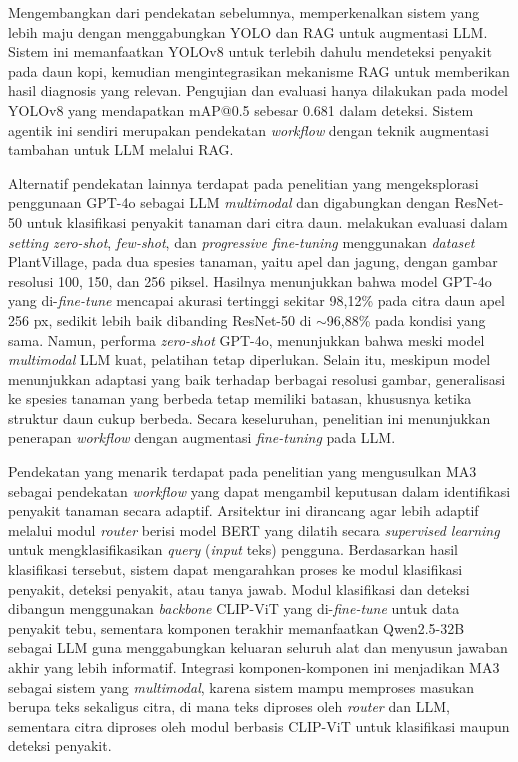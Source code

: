 Mengembangkan dari pendekatan sebelumnya, \textcite{mondalVisionMeetsLanguage2025} memperkenalkan sistem yang lebih maju dengan menggabungkan YOLO dan RAG untuk augmentasi LLM. Sistem ini memanfaatkan YOLOv8 untuk terlebih dahulu mendeteksi penyakit pada daun kopi, kemudian mengintegrasikan mekanisme RAG untuk memberikan hasil diagnosis yang relevan. Pengujian dan evaluasi hanya dilakukan pada model YOLOv8 yang mendapatkan mAP@0.5 sebesar 0.681 dalam deteksi. Sistem agentik ini sendiri merupakan pendekatan \textit{workflow} dengan teknik augmentasi tambahan untuk LLM melalui RAG.

Alternatif pendekatan lainnya terdapat pada penelitian \textcite{roumeliotisPlantDiseaseDetection2025} yang mengeksplorasi penggunaan GPT-4o sebagai LLM \textit{multimodal} dan digabungkan dengan ResNet-50 untuk klasifikasi penyakit tanaman dari citra daun. \citeauthor{roumeliotisPlantDiseaseDetection2025} melakukan evaluasi dalam \textit{setting zero-shot}, \textit{few-shot}, dan \textit{progressive fine-tuning} menggunakan \textit{dataset} PlantVillage, pada dua spesies tanaman, yaitu apel dan jagung, dengan gambar resolusi 100, 150, dan 256 piksel. Hasilnya menunjukkan bahwa model GPT-4o yang di-\textit{fine-tune} mencapai akurasi tertinggi sekitar 98,12\% pada citra daun apel 256 px, sedikit lebih baik dibanding ResNet-50 di $\sim$96,88\% pada kondisi yang sama. Namun, performa \textit{zero-shot} GPT-4o, menunjukkan bahwa meski model \textit{multimodal} LLM kuat, pelatihan tetap diperlukan. Selain itu, meskipun model menunjukkan adaptasi yang baik terhadap berbagai resolusi gambar, generalisasi ke spesies tanaman yang berbeda tetap memiliki batasan, khususnya ketika struktur daun cukup berbeda. Secara keseluruhan, penelitian ini menunjukkan penerapan \textit{workflow} dengan augmentasi \textit{fine-tuning} pada LLM.

Pendekatan yang menarik terdapat pada penelitian \textcite{xuMultimodalAgriculturalAgent2025} yang mengusulkan MA3 sebagai pendekatan \textit{workflow} yang dapat mengambil keputusan dalam identifikasi penyakit tanaman secara adaptif. Arsitektur ini dirancang agar lebih adaptif melalui modul \textit{router} berisi model BERT yang dilatih secara \textit{supervised learning} untuk mengklasifikasikan \textit{query} (\textit{input} teks) pengguna. Berdasarkan hasil klasifikasi tersebut, sistem dapat mengarahkan proses ke modul klasifikasi penyakit, deteksi penyakit, atau tanya jawab. Modul klasifikasi dan deteksi dibangun menggunakan \textit{backbone} CLIP-ViT yang di-\textit{fine-tune} untuk data penyakit tebu, sementara komponen terakhir memanfaatkan Qwen2.5-32B sebagai LLM guna menggabungkan keluaran seluruh alat dan menyusun jawaban akhir yang lebih informatif. Integrasi komponen-komponen ini menjadikan MA3 sebagai sistem yang \textit{multimodal}, karena sistem mampu memproses masukan berupa teks sekaligus citra, di mana teks diproses oleh \textit{router} dan LLM, sementara citra diproses oleh modul berbasis CLIP-ViT untuk klasifikasi maupun deteksi penyakit.

